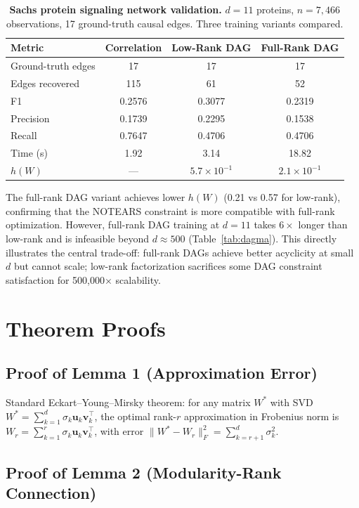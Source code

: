 \documentclass{article}
\theoremstyle{definition}
\begin{document}
\begin{table}[H]
\centering
\caption{\textbf{Sachs protein signaling network validation.} $d=11$ proteins, $n=7{,}466$ observations, 17 ground-truth causal edges. Three training variants compared.}
\label{tab:sachs}
\small
\begin{tabular}{lccc}
\toprule
Metric & Correlation & Low-Rank DAG & Full-Rank DAG \\
\midrule
Ground-truth edges & 17 & 17 & 17 \\
Edges recovered & 115 & 61 & 52 \\
F1 & 0.2576 & 0.3077 & 0.2319 \\
Precision & 0.1739 & 0.2295 & 0.1538 \\
Recall & 0.7647 & 0.4706 & 0.4706 \\
Time (s) & 1.92 & 3.14 & 18.82 \\
$h(W)$ & --- & $5.7 \times 10^{-1}$ & $2.1 \times 10^{-1}$ \\
\bottomrule
\end{tabular}

The full-rank DAG variant achieves lower $h(W)$ (0.21 vs 0.57 for low-rank), confirming that the NOTEARS constraint is more compatible with full-rank optimization. However, full-rank DAG training at $d=11$ takes $6\times$ longer than low-rank and is infeasible beyond $d \approx 500$ (Table~\ref{tab:dagma}). This directly illustrates the central trade-off: full-rank DAGs achieve better acyclicity at small $d$ but cannot scale; low-rank factorization sacrifices some DAG constraint satisfaction for 500,000$\times$ scalability.
\end{table}

\section{Theorem Proofs}
\label{app:proofs}

\subsection*{Proof of Lemma 1 (Approximation Error)}

Standard Eckart--Young--Mirsky theorem: for any matrix $W^*$ with SVD $W^* = \sum_{k=1}^d \sigma_k \mathbf{u}_k \mathbf{v}_k^\top$, the optimal rank-$r$ approximation in Frobenius norm is $W_r = \sum_{k=1}^r \sigma_k \mathbf{u}_k \mathbf{v}_k^\top$, with error $\|W^* - W_r\|_F^2 = \sum_{k=r+1}^d \sigma_k^2$.

\subsection*{Proof of Lemma 2 (Modularity-Rank Connection)}
\end{document}
